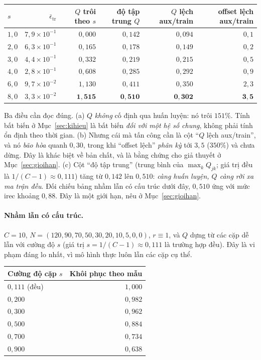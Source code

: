 \documentclass[11pt]{article}
\theoremstyle{remark}
\begin{document}
\begin{center}
\footnotesize
\begin{tabular}{@{}lrrrrr@{}}
\toprule
$s$ & $\bar\epsilon_{\mathrm{tr}}$ & $Q$ trôi theo $s$ & độ tập trung $Q$
 & $Q$ lệch aux/train & offset lệch aux/train \\
\midrule
$1{,}0$ & $7{,}9\times10^{-1}$ & $0{,}000$ & $0{,}142$ & $0{,}094$ & $0{,}1$ \\
$2{,}0$ & $6{,}3\times10^{-1}$ & $0{,}165$ & $0{,}178$ & $0{,}149$ & $0{,}2$ \\
$3{,}0$ & $4{,}4\times10^{-1}$ & $0{,}332$ & $0{,}219$ & $0{,}215$ & $0{,}5$ \\
$4{,}0$ & $2{,}8\times10^{-1}$ & $0{,}608$ & $0{,}285$ & $0{,}292$ & $0{,}9$ \\
$6{,}0$ & $9{,}7\times10^{-2}$ & $1{,}130$ & $0{,}411$ & $0{,}350$ & $2{,}3$ \\
$8{,}0$ & $3{,}3\times10^{-2}$ & $\mathbf{1{,}515}$ & $\mathbf{0{,}510}$ & $\mathbf{0{,}302}$ & $\mathbf{3{,}5}$ \\
\bottomrule
\end{tabular}
\end{center}

Ba điều cần đọc đúng. (a) $Q$ \emph{không} cố định qua huấn luyện: nó trôi
$151\%$. Tính bất biến ở Mục~\ref{sec:kihieu} là bất biến \emph{đối với một
hệ số chung}, không phải tính ổn định theo thời gian. (b) Nhưng cái mà tấn
công cần là cột ``$Q$ lệch aux/train'', và nó \emph{bão hòa} quanh $0{,}30$,
trong khi ``offset lệch'' \emph{phân kỳ} tới $3{,}5$ ($350\%$) và chưa dừng.
Đây là khác biệt về bản chất, và là bằng chứng cho giả thuyết ở
Mục~\ref{sec:gioihan}. (c) Cột ``độ tập trung'' (trung bình của
$\max_k Q_{jk}$; giá trị đều là $1/(C-1)\approx0{,}111$) tăng từ $0{,}142$
lên $0{,}510$: \emph{càng huấn luyện, $Q$ càng rời xa ma trận đều}. Đối chiếu
bảng nhầm lẫn có cấu trúc dưới đây, $0{,}510$ ứng với mức irec khoảng
$0{,}88$. Đây là một giới hạn, nêu ở Mục~\ref{sec:gioihan}.

\paragraph{Nhầm lẫn có cấu trúc.}
$C=10$, $N=(120,90,70,50,30,20,10,5,0,0)$, $r\equiv1$, và $Q$ dựng từ các cặp
dễ lẫn với cường độ $s$ (giá trị $s=1/(C-1)\approx0{,}111$ là trường hợp
đều). Đây là vi phạm đáng lo nhất, vì mô hình thực luôn lẫn các cặp cụ thể.

\begin{center}
\footnotesize
\begin{tabular}{@{}lr@{}}
\toprule
Cường độ cặp $s$ & Khôi phục theo mẫu \\
\midrule
$0{,}111$ (đều) & $1{,}000$ \\
$0{,}200$ & $0{,}982$ \\
$0{,}300$ & $0{,}962$ \\
$0{,}500$ & $0{,}884$ \\
$0{,}700$ & $0{,}734$ \\
$0{,}900$ & $0{,}638$ \\
\bottomrule
\end{tabular}
\end{center}
\end{document}
